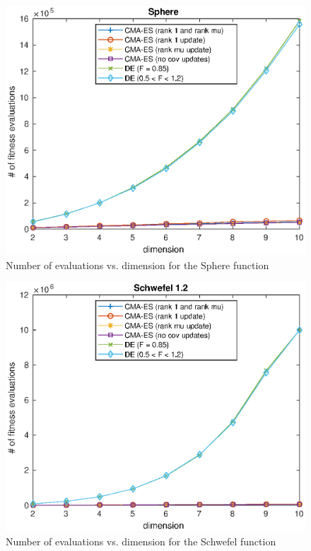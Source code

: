 \documentclass[12pt]{article}
\begin{document}
\begin{figure}[H]
    \centering
    \includegraphics[width=0.8\linewidth]{pics/sphere_NvN.eps}
    \caption{Number of evaluations vs. dimension for the Sphere function}
    \label{fig:sphere_nvn}
\end{figure}

\begin{figure}[H]
    \centering
    \includegraphics[width=0.75\linewidth]{pics/schwefel_NvN.eps}
    \caption{Number of evaluations vs. dimension for the Schwefel function}
    \label{fig:schwefel_nvn}
\end{figure}
\end{document}
